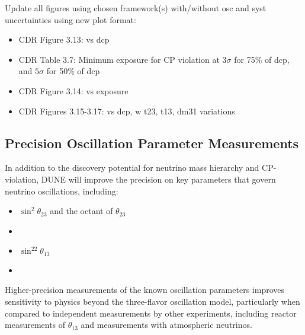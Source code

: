  Update all figures using chosen framework(s) with/without osc and syst uncertainties using new plot format:
\begin{itemize}
	\item CDR Figure 3.13: vs dcp
	\item CDR Table 3.7: Minimum exposure for CP violation at $3\sigma$ for 75\% of dcp, and $5\sigma$ for 50\% of dcp
	\item CDR Figure 3.14: vs exposure
	\item CDR Figures 3.15-3.17: vs dcp, w t23, t13, dm31 variations
\end{itemize}

\subsection{Precision Oscillation Parameter Measurements}
\label{sec:physics-lbnosc-prec}

In addition to the discovery potential for neutrino mass hierarchy and CP-violation, 
DUNE will improve the precision on key parameters that govern neutrino oscillations, including:
\begin{itemize}
 \item $\sin^2\theta_{23}$ and the octant of $\theta_{23}$
 \item \deltacp
 \item $\sin^22\theta_{13}$
 \item {}
\end{itemize}

Higher-precision measurements of the known oscillation parameters improves sensitivity to physics beyond the three-flavor oscillation model, particularly when compared to independent measurements by other experiments, including reactor measurements of $\theta_{13}$ and
measurements with atmospheric neutrinos. 

